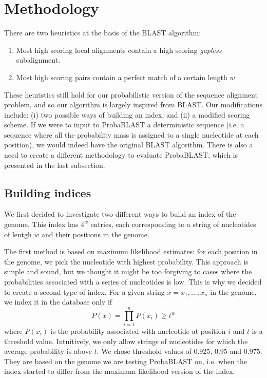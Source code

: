 \documentclass[12pt]{article}%
\begin{document}
\section{Methodology}

There are two heuristics at the basis of the BLAST algorithm:
\begin{enumerate}
\item Most high scoring local alignments contain a high scoring \emph{gapless} subalignment.
\item Most high scoring pairs contain a perfect match of a certain length $w$
\end{enumerate}
These heuristics still hold for our probabilistic version of the sequence alignment problem, and so our algorithm is largely inspired from BLAST. Our modifications include: (i) two possible ways of building an index, and (ii) a modified scoring scheme. If we were to input to ProbaBLAST a deterministic sequence (i.e. a sequence where all the probability mass is assigned to a single nucleotide at each position), we would indeed have the original BLAST algorithm. There is also a need to create a different methodology to evaluate ProbaBLAST, which is presented in the last subsection.

\subsection{Building indices}

We first decided to investigate two different ways to build an index of the genome. This index has $4^w$ entries, each corresponding to a string of nucleotides of lentgh $w$ and their positions in the genome.

The first method is based on maximum likelihood estimates: for each position in the genome, we pick the nucleotide with highest probability. This approach is simple and sound, but we thought it might be too forgiving to cases where the probabilities associated with a series of nucleotides is low.
This is why we decided to create a second type of index. For a given string $x=x_1,\dots,x_n$ in the genome, we index it in the database only if 
$$P(x)=\prod_{i=1}^{n}P(x_i)\geq t^w$$
where $P(x_i)$ is the probability associated with nucleotide at position $i$  and $t$ is a threshold value. Intuitively, we only allow strings of nucleotides for which the average probability is above $t$. We chose threshold values of $0.925$, $0.95$ and $0.975$. They are based on the genome we are testing ProbaBLAST on, i.e. when the index started to differ from the maximum likelihood version of the index.
\end{document}
